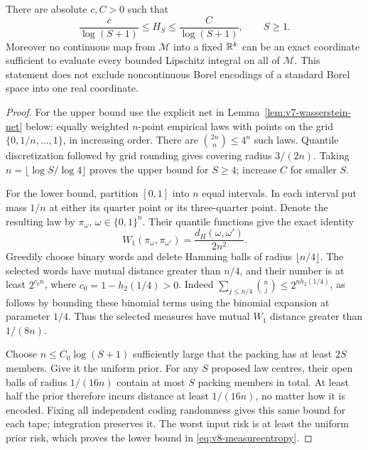 \begin{theorem}
\label{thm:v8-measureentropy}
There are absolute $c,C>0$ such that
\begin{equation}
                \frac{c}{\log(S+1)}\le H_S
                      \le\frac{C}{\log(S+1)},\qquad S\ge1.
                                                        \label{eq:v8-measureentropy}
\end{equation}
Moreover no continuous map from $\mathcal M$ into a fixed $\mathbb R^k$ can
be an exact coordinate sufficient to evaluate every bounded Lipschitz
integral on all of $\mathcal M$. This statement does not exclude
noncontinuous Borel encodings of a standard Borel space into one real
coordinate.
\end{theorem}
\begin{proof}
For the upper bound use the explicit net in Lemma~\ref{lem:v7-wasserstein-net}
below: equally weighted $n$-point empirical laws with points on the grid
$\{0,1/n,\ldots,1\}$, in increasing order. There are
$\binom{2n}{n}\le4^n$ such laws. Quantile discretization followed by grid
rounding gives covering radius $3/(2n)$. Taking
$n=\lfloor\log S/\log4\rfloor$ proves the upper bound for $S\ge4$;
increase $C$ for smaller $S$.

For the lower bound, partition $[0,1]$ into $n$ equal intervals. In each
interval put mass $1/n$ at either its quarter point or its three-quarter
point. Denote the resulting law by $\pi_\omega$,
$\omega\in\{0,1\}^n$. Their quantile functions give the exact identity
\begin{equation}
 W_1(\pi_\omega,\pi_{\omega'})
                   =\frac{d_H(\omega,\omega')}{2n^2}. \label{eq:v8-wasserstein-code}
\end{equation}
Greedily choose binary words and delete Hamming balls of radius
$\lfloor n/4\rfloor$. The selected words have mutual distance greater
than $n/4$, and their number is at least
$2^{c_0 n}$, where $c_0=1-h_2(1/4)>0$. Indeed
$\sum_{j\le n/4}\binom nj\le2^{n h_2(1/4)}$, as follows by bounding
these binomial terms using the binomial expansion at parameter $1/4$.
Thus the selected measures have mutual $W_1$ distance greater than
$1/(8n)$.

Choose $n\le C_0\log(S+1)$ sufficiently large that the packing has at
least $2S$ members. Give it the uniform prior. For any $S$ proposed law
centres, their open balls of radius $1/(16n)$ contain at most $S$ packing
members in total. At least half the prior therefore incurs distance at
least $1/(16n)$, no matter how it is encoded. Fixing all independent
coding randomness gives this same bound for each tape; integration
preserves it. The worst input risk is at least the uniform prior risk,
which proves the lower bound in \eqref{eq:v8-measureentropy}.


\end{proof}
